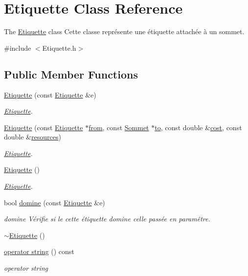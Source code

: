 \hypertarget{class_etiquette}{\section{Etiquette Class Reference}
\label{class_etiquette}
}


The \hyperlink{class_etiquette}{Etiquette} class Cette classe représente une étiquette attachée à un sommet.  




{\ttfamily \#include $<$Etiquette.\+h$>$}

\subsection*{Public Member Functions}
\begin{DoxyCompactItemize}
\item 
\hyperlink{class_etiquette_a8b948d9bbaf895a2d66568f5e57c7de3}{Etiquette} (const \hyperlink{class_etiquette}{Etiquette} \&e)
\begin{DoxyCompactList}\small\item\em \hyperlink{class_etiquette}{Etiquette}. \end{DoxyCompactList}\item 
\hyperlink{class_etiquette_a83a1072b91450c15983e2e8aa02407c0}{Etiquette} (const \hyperlink{class_etiquette}{Etiquette} $\ast$\hyperlink{class_etiquette_a18f4af505c332fe206d08598f6471e46}{from}, const \hyperlink{class_sommet}{Sommet} $\ast$\hyperlink{class_etiquette_a8bd5882f6591338a62df5e5239103594}{to}, const double \&\hyperlink{class_etiquette_adb966761f009b397b8c70bcfed7f1c8c}{cost}, const double \&\hyperlink{class_etiquette_a12d2960b9e33da5ff3b0e1352bd1e4b2}{resources})
\begin{DoxyCompactList}\small\item\em \hyperlink{class_etiquette}{Etiquette}. \end{DoxyCompactList}\item 
\hyperlink{class_etiquette_a49a83a7682c03c2bf47b7f15cba8b479}{Etiquette} ()
\begin{DoxyCompactList}\small\item\em \hyperlink{class_etiquette}{Etiquette}. \end{DoxyCompactList}\item 
bool \hyperlink{class_etiquette_a3340880a27622cf152015cd731b9d131}{domine} (const \hyperlink{class_etiquette}{Etiquette} \&e)
\begin{DoxyCompactList}\small\item\em domine Vérifie si le cette étiquette domine celle passée en paramêtre. \end{DoxyCompactList}\item 
\hyperlink{class_etiquette_a77d0f0eeb7cc85094d3bb0153ececd44}{$\sim$\+Etiquette} ()
\item 
\hyperlink{class_etiquette_aa590c6f160a4e084559a7d286b01f4be}{operator string} () const 
\begin{DoxyCompactList}\small\item\em operator string \end{DoxyCompactList}\end{DoxyCompactItemize}
